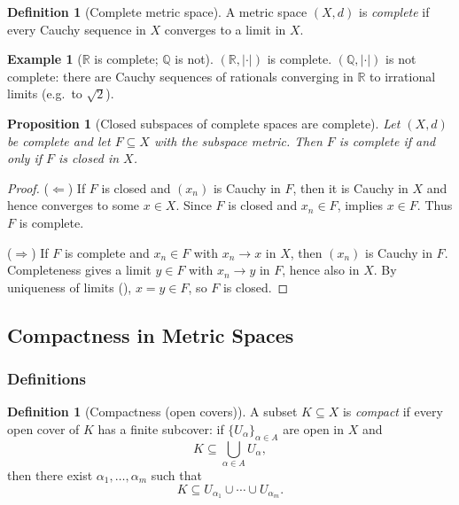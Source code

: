 \documentclass[12pt]{article}
\numberwithin{equation}{section}
\def\abs#1{|#1|}
\newcommand{\RR}{\mathbb{R}}
\newcommand{\QQ}{\mathbb{Q}}
\DeclarePairedDelimiter{\abs}{\lvert}{\rvert}
\theoremstyle{plain}
\newtheorem{proposition}[theorem]{Proposition}
\theoremstyle{definition}
\newtheorem{definition}[theorem]{Definition}
\newtheorem{example}[theorem]{Example}
\theoremstyle{remark}
\begin{document}
\begin{definition}[Complete metric space]\label{ms:def:complete}
A metric space $(X,d)$ is \emph{complete} if every Cauchy sequence in $X$ converges to a limit in $X$.
\end{definition}

\begin{example}[$\RR$ is complete; $\QQ$ is not]\label{ms:ex:R-complete-Q-not}
$(\RR,\abs{\cdot})$ is complete.
$(\QQ,\abs{\cdot})$ is not complete: there are Cauchy sequences of rationals converging in $\RR$ to irrational limits (e.g.\ to $\sqrt2$).
\end{example}

\begin{proposition}[Closed subspaces of complete spaces are complete]\label{ms:prop:closed-complete}
Let $(X,d)$ be complete and let $F\subseteq X$ with the subspace metric.
Then $F$ is complete if and only if $F$ is closed in $X$.
\end{proposition}

\begin{proof}
($\Leftarrow$) If $F$ is closed and $(x_n)$ is Cauchy in $F$, then it is Cauchy in $X$ and hence converges to some $x\in X$.
Since $F$ is closed and $x_n\in F$,  implies $x\in F$. Thus $F$ is complete.

($\Rightarrow$) If $F$ is complete and $x_n\in F$ with $x_n\to x$ in $X$, then $(x_n)$ is Cauchy in $F$.
Completeness gives a limit $y\in F$ with $x_n\to y$ in $F$, hence also in $X$.
By uniqueness of limits (), $x=y\in F$, so $F$ is closed.
\end{proof}

\subsection{Compactness in Metric Spaces}

\subsubsection{Definitions}

\begin{definition}[Compactness (open covers)]\label{ms:def:compact}
A subset $K\subseteq X$ is \emph{compact} if every open cover of $K$ has a finite subcover:
if $\{U_\alpha\}_{\alpha\in A}$ are open in $X$ and
\[
K\subseteq \bigcup_{\alpha\in A} U_\alpha,
\]
then there exist $\alpha_1,\dots,\alpha_m$ such that
\[
K\subseteq U_{\alpha_1}\cup\cdots\cup U_{\alpha_m}.
\]
\end{definition}
\end{document}
